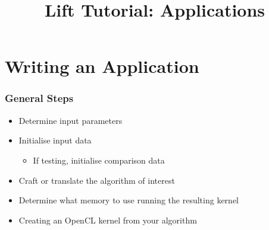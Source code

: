 \documentclass[10pt]{beamer}
\title{Lift Tutorial: Applications}
\date{}
\begin{document}
\begin{frame}
\maketitle
\end{frame}


\section{Writing an Application}

\begin{frame}
\frametitle{General Steps}
\begin{itemize}
    \item Determine input parameters 
    \item Initialise input data 
            \begin{itemize}
                \item If testing, initialise comparison data 
            \end{itemize}
    \item Craft or translate the algorithm of interest 
    \item Determine what memory to use running the resulting kernel 
    \item Creating an OpenCL kernel from your algorithm 
\end{itemize}
\end{frame}
\end{document}
